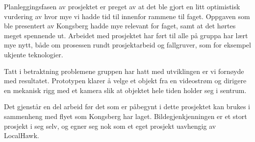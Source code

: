 Planleggingsfasen av prosjektet er preget av at det ble gjort en litt optimistisk vurdering av hvor mye vi hadde tid til innenfor rammene til faget. Oppgaven som ble presentert av Kongsberg hadde mye relevant for faget, samt at det hørtes meget spennende ut. Arbeidet med prosjektet har ført til alle på gruppa har lært mye nytt, både om prosessen rundt prosjektarbeid og fallgruver, som for eksempel ukjente teknologier.

Tatt i betraktning problemene gruppen har hatt med utviklingen er vi fornøyde med resultatet. Prototypen klarer å velge et objekt fra en videostrøm og dirigere en mekanisk rigg med et kamera slik at objektet hele tiden holder seg i sentrum.

Det gjenstår en del arbeid før det som er påbegynt i dette prosjektet kan brukes i sammenheng med flyet som Kongsberg har laget. Bildegjenkjenningen er et stort prosjekt i seg selv, og egner seg nok som et eget prosjekt uavhengig av LocalHawk.